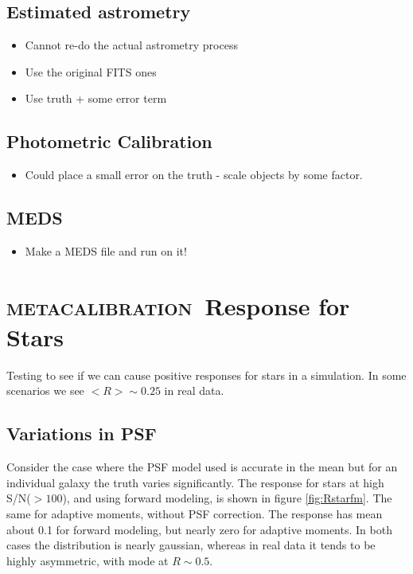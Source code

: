 \documentclass[\docopts]{\docclass}
\newcommand{\mcal}{\textsc{metacalibration}}
\newcommand{\snr}{S/N}
\begin{document}
\subsection{Estimated astrometry}
\begin{itemize}
\item Cannot re-do the actual astrometry process
\item Use the original FITS ones
\item Use truth + some error term
\end{itemize}

\subsection{Photometric Calibration}
\begin{itemize}
\item Could place a small error on the truth - scale objects by some factor.
\end{itemize}

\subsection{MEDS}
\begin{itemize}
\item Make a MEDS file and run on it!
\end{itemize}

\section{\mcal\ Response for Stars}

Testing to see if we can cause positive responses for stars in a simulation.
In some scenarios we see $<R> \sim 0.25$ in real data.

\subsection{Variations in PSF}

Consider the case where the PSF model used is accurate in the mean but 
for an individual galaxy the truth varies significantly.  The response
for stars at high \snr ($> 100$), and using forward modeling, is shown in
figure \ref{fig:Rstarfm}.  The same for adaptive moments, without
PSF correction. The response has mean about 0.1 for forward modeling,
but nearly zero for adaptive moments.  In both cases the distribution
is nearly gaussian, whereas in real data it tends to be highly asymmetric,
with mode at $R \sim 0.5$.
\end{document}
